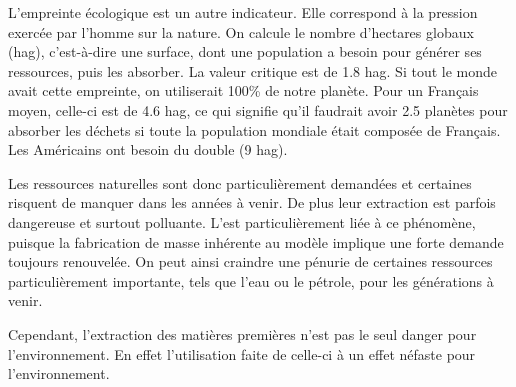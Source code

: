 L'empreinte écologique est un autre indicateur. Elle correspond à la pression exercée par l'homme sur la nature. On calcule le nombre d'hectares globaux (hag), c'est-à-dire une surface, dont une population a besoin pour générer ses ressources, puis les absorber. La valeur critique est de 1.8 hag. Si tout le monde avait cette empreinte, on utiliserait 100\% de notre planète. Pour un Français moyen, celle-ci est de 4.6 hag, ce qui signifie qu'il faudrait avoir 2.5 planètes pour absorber les déchets si toute la population mondiale était composée de Français. Les Américains ont besoin du double (9 hag).

\medbreak Les ressources naturelles sont donc particulièrement demandées et certaines risquent de manquer dans les années à venir. De plus leur extraction est parfois dangereuse et surtout polluante. L'\op est particulièrement liée à ce phénomène, puisque la fabrication de masse inhérente au modèle implique une forte demande toujours renouvelée. On peut ainsi craindre une pénurie de certaines ressources particulièrement importante, tels que l'eau ou le pétrole, pour les générations à venir.

Cependant, l'extraction des matières premières n'est pas le seul danger pour l'environnement. En effet l'utilisation faite de celle-ci à un effet néfaste pour l'environnement.






